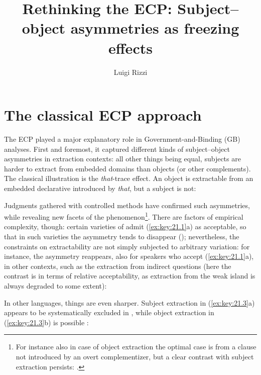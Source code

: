 \documentclass[output=paper]{langsci/langscibook}
\author{Luigi Rizzi}
\title{Rethinking the ECP: Subject--object asymmetries as freezing effects}
\begin{document}
\glsresetall

\section{The classical ECP approach}

The \gls{ECP} played a major explanatory role in
Govern\-ment-and-Binding (\gls{GB}) analyses.  First and foremost,
it captured different kinds of subject--object asymmetries in extraction
contexts: all other things being equal, subjects are harder to extract from
embedded domains than objects (or other complements).  The classical
illustration is the \emph{that}-trace effect. An object is extractable from an
embedded declarative introduced by \emph{that}, but a subject is not:

\ea%
    \label{ex:key:21.1}
    \z
\z
%
Judgments gathered with controlled methods have confirmed such asymmetries,
while revealing new facets of the phenomenon\footnote{For instance also in case
    of object extraction the optimal case is from a clause not introduced by an
    overt complementizer, but a clear contrast with subject extraction
    persists: \citet{Schippers2012}.}. There are factors of empirical
    complexity, though: certain varieties of  admit (\ref{ex:key:21.1}a) as
    acceptable, so that in such varieties the asymmetry tends to disappear
    (\citealt{Sobin2002,Schippers2012}); nevertheless, the constraints on
    extractability are not simply subjected to arbitrary variation: for
    instance, the asymmetry reappears, also for speakers who accept
    (\ref{ex:key:21.1}a), in other contexts, such as the extraction from indirect
    questions (here the contrast is in terms of relative acceptability, as
    extraction from the weak island is always degraded to some extent):

\ea%
    \label{ex:key:21.2}
    \z
\z
%
In other languages, things are even sharper. Subject extraction in
(\ref{ex:key:21.3}a) appears to be systematically excluded in ,
while object extraction in (\ref{ex:key:21.3}b) is possible
\citep{Berthelot2017}:
\end{document}
